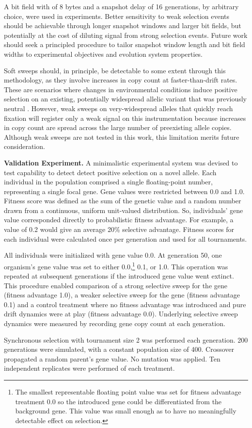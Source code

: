 A bit field with of 8 bytes and a snapshot delay of 16 generations, by arbitrary choice, were used in experiments.
Better sensitivity to weak selection events should be achievable through longer snapshot windows and larger bit fields, but potentially at the cost of diluting signal from strong selection events.
Future work should seek a principled procedure to tailor snapshot window length and bit field widths to experimental objectives and evolution system properties.

Soft sweeps should, in principle, be detectable to some extent through this methodology, as they involve increases in copy count at faster-than-drift rates.
These are scenarios where changes in environmental conditions induce positive selection on an existing, potentially widespread allelic variant that was previously neutral \citep{hermisson2005soft}.
However, weak sweeps on very-widespread alleles that quickly reach fixation will register only a weak signal on this instrumentation because increases in copy count are spread across the large number of preexisting allele copies.
Although weak sweeps are not tested in this work, this limitation merits future consideration.

\textbf{Validation Experiment.}
A minimalistic experimental system was devised to test capability to detect detect positive selection on a novel allele.
Each individual in the population comprised a single floating-point number, representing a single focal gene.
Gene values were restricted between 0.0 and 1.0.
Fitness score was defined as the sum of the genetic value and a random number drawn from a continuous, uniform unit-valued distribution.
So, individuals' gene value corresponded directly to probabilistic fitness advantage.
For example, a value of 0.2 would give an average 20\% selective advantage.
Fitness scores for each individual were calculated once per generation and used for all tournaments.

All individuals were initialized with gene value 0.0.
At generation 50, one organism's gene value was set to either 0.0,\footnote{The smallest representable floating point value was set for fitness advantage treatment 0.0 so the introduced gene could be differentiated from the background gene.
This value was small enough as to have no meaningfully detectable effect on selection.} 0.1, or 1.0.
This operation was repeated at subsequent generations if the introduced gene value went extinct.
This procedure enabled comparison of a strong selective sweep for the gene (fitness advantage 1.0), a weaker selective sweep for the gene (fitness advantage 0.1) and a control treatment where no fitness advantage was introduced and pure drift dynamics were at play (fitness advantage 0.0).
Underlying selective sweep dynamics were measured by recording gene copy count at each generation.

Synchronous selection with tournament size 2 was performed each generation.
200 generations were simulated, with a constant population size of 400.
Crossover propagated a random parent's gene value.
No mutation was applied.
Ten independent replicates were performed of each treatment.
